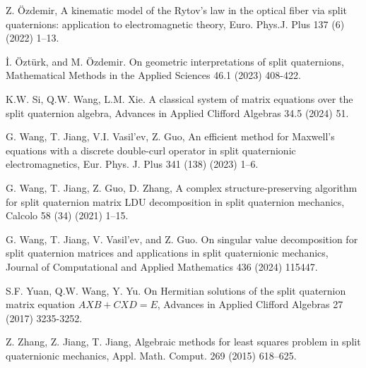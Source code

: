 \documentclass[3p]{elsarticle}
\numberwithin{equation}{section}
\begin{document}
\begin{thebibliography}{99}

 Z. Özdemir, A kinematic model of the Rytov’s law in the optical fiber via split quaternions: application to electromagnetic theory, Euro. Phys.J. Plus 137 (6) (2022) 1–13.

 İ. Öztürk, and M. Özdemir. On geometric interpretations of split quaternions, Mathematical Methods in the Applied Sciences 46.1 (2023) 408-422.

 K.W. Si, Q.W. Wang, L.M. Xie. A classical system of matrix equations over the split quaternion algebra, Advances in Applied Clifford Algebras 34.5 (2024) 51.

 G. Wang, T. Jiang, V.I. Vasil’ev, Z. Guo, An efficient method for Maxwell’s equations with a discrete double-curl operator in split quaternionic electromagnetics, Eur. Phys. J. Plus 341 (138) (2023) 1–6.

G. Wang, T. Jiang, Z. Guo, D. Zhang, A complex structure-preserving algorithm for split quaternion matrix LDU decomposition in split quaternion mechanics, Calcolo 58 (34) (2021) 1–15.

G. Wang, T. Jiang, V. Vasil’ev, and Z. Guo. On singular value decomposition for split quaternion matrices and applications in split quaternionic mechanics, Journal of Computational and Applied Mathematics 436 (2024) 115447.

S.F. Yuan, Q.W. Wang, Y. Yu. On Hermitian solutions of the split quaternion matrix equation $AXB+CXD=E$, Advances in Applied Clifford Algebras 27 (2017) 3235-3252.

Z. Zhang, Z. Jiang, T. Jiang, Algebraic methods for least squares problem in split quaternionic mechanics, Appl. Math. Comput. 269 (2015) 618–625.

\end{thebibliography}
\end{document}
